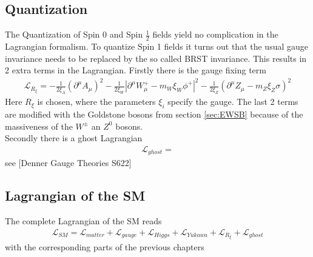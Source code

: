\subsection{Quantization}
The Quantization of Spin 0 and Spin $\frac{1}{2}$ fields yield no complication in the Lagrangian formalism. To quantize Spin 1 fields it turns out that the usual gauge invariance needs to be replaced by the so called BRST invariance. This results in 2 extra terms in the Lagrangian. Firstly there is the gauge fixing term
\begin{align}
\mathcal{L}_{R_\xi} = -\frac{1}{2\xi_A} (\partial^\mu A_\mu)^2  - \frac{1}{2\xi_W} |\partial^\mu W_\mu^+ - m_W \xi_W \phi^+|^2 - \frac{1}{2\xi_Z} (\partial^\mu Z_\mu - m_Z \xi_Z \sigma)^2 
\end{align}
Here $R_\xi$ is chosen, where the parameters $\xi_i$ specify the gauge. The last 2 terms are modified with the Goldstone bosons from section \ref{sec:EWSB} because of the massiveness of the $W^\pm$ an $Z^0$ bosons.\cite{book:811554}\\%
Secondly there is a ghost Lagrangian
\begin{align}
\mathcal{L}_{ghost} = 
\end{align}
see [Denner Gauge Theories S622]

\subsection{Lagrangian of the SM}
The complete Lagrangian of the SM reads
\begin{align}
\mathcal{L}_{SM} = \mathcal{L}_{matter} + \mathcal{L}_{gauge} + \mathcal{L}_{Higgs} + \mathcal{L}_{Yukawa} + \mathcal{L}_{R_\xi} + \mathcal{L}_{ghost}
\end{align}
with the corresponding parts of the previous chapters
